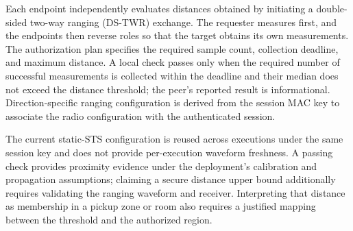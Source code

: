 \documentclass[sigconf,authordraft]{acmart}
\begin{document}
Each endpoint independently evaluates distances obtained by initiating a double-sided two-way ranging (DS-TWR) exchange.
The requester measures first, and the endpoints then reverse roles so that the target obtains its own measurements.
The authorization plan specifies the required sample count, collection deadline, and maximum distance.
A local check passes only when the required number of successful measurements is collected within the deadline and their median does not exceed the distance threshold; the peer's reported result is informational.
Direction-specific ranging configuration is derived from the session MAC key to associate the radio configuration with the authenticated session.

The current static-STS configuration is reused across executions under the same session key and does not provide per-execution waveform freshness.
A passing check provides proximity evidence under the deployment's calibration and propagation assumptions; claiming a secure distance upper bound additionally requires validating the ranging waveform and receiver.
Interpreting that distance as membership in a pickup zone or room also requires a justified mapping between the threshold and the authorized region.


\end{document}
